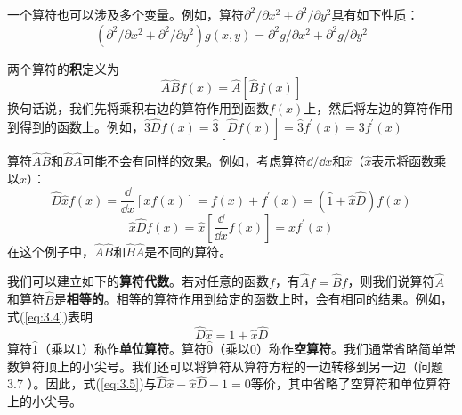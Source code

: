 	一个算符也可以涉及多个变量。例如，算符$\partial^2/\partial x^2+\partial^2/\partial y^2$具有如下性质：
	\begin{equation*}
		\left(\partial^2/\partial x^2+\partial^2/\partial y^2\right)g\left(x,y\right)= \partial^2 g/\partial x^2 + \partial^2 g/\partial y^2
	\end{equation*}

	两个算符的\textbf{积}定义为
	\begin{equation}
		\boxed{
			\hat{A}\hat{B}f\left(x\right) = \hat{A}\left[\hat{B}f\left(x\right)\right]
		}
		\label{eq:3.3 definition of operators' product}
	\end{equation}
	换句话说，我们先将乘积右边的算符作用到函数$f\left(x\right)$上，然后将左边的算符作用到得到的函数上。例如，$\hat{3}\hat{D}f\left(x\right) = \hat{3}\left[\hat{D}f\left(x\right)\right] = \hat{3}f^{\prime}\left(x\right) = 3f^{\prime}\left(x\right)$

	算符$\hat{A}\hat{B}$和$\hat{B}\hat{A}$可能不会有同样的效果。例如，考虑算符$\dd /\dd x$和$\hat{x}$（$\hat{x}$表示将函数乘以$x$）：
	\begin{equation}
		\hat{D}\hat{x}f\left(x\right)=\frac{\dd }{\dd x}\left[xf\left(x\right)\right] = f\left(x\right) + f^{\prime}\left(x\right) = \left(\hat{1}+\hat{x}\hat{D}\right)f\left(x\right)
		\label{eq:3.4}
	\end{equation}
	\begin{equation*}
		\hat{x}\hat{D}f\left(x\right) = \hat{x}\left[\frac{\dd }{\dd x}f\left(x\right)\right] = xf^{\prime}\left(x\right)
	\end{equation*}
	在这个例子中，$\hat{A}\hat{B}$和$\hat{B}\hat{A}$是不同的算符。

	我们可以建立如下的\textbf{算符代数}。若对任意的函数$f$，有$\hat{A}f = \hat{B}f$，则我们说算符$\hat{A}$和算符$\hat{B}$是\textbf{相等的}。相等的算符作用到给定的函数上时，会有相同的结果。例如，式(\ref{eq:3.4})表明
	\begin{equation}
		\hat{D}\hat{x} = 1 + \hat{x}\hat{D}
		\label{eq:3.5}
	\end{equation}
	算符$\hat{1}$（乘以1）称作\textbf{单位算符}。算符$\hat{0}$（乘以0）称作\textbf{空算符}。我们通常省略简单常数算符顶上的小尖号。我们还可以将算符从算符方程的一边转移到另一边（问题 3.7 ）。因此，式(\ref{eq:3.5})与$\hat{D}\hat{x}-\hat{x}\hat{D}-1 = 0$等价，其中省略了空算符和单位算符上的小尖号。

